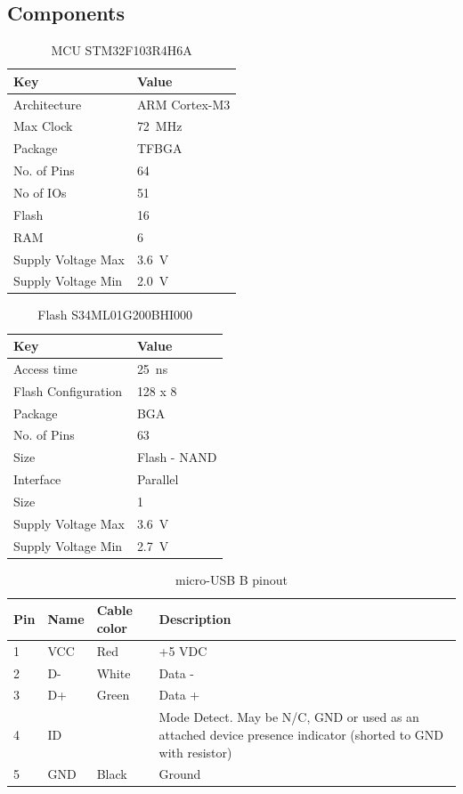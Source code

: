 \documentclass[final,a4paper]{report} %
\begin{document}
\subsection{Components}
\begin{table}[h]
	\centering
	\caption{MCU STM32F103R4H6A}
	\label{tab:mcu-specs}		
	\begin{tabular}{ll}
		\toprule		
		Key & Value \\
		\hline
		Architecture & ARM Cortex-M3 \\
		Max Clock & \SI{72}{\mega\hertz} \\
		Package & TFBGA \\
		No. of Pins & 64 \\
		No of IOs & 51 \\
		Flash & \SI{16}{\kibi\byte} \\
		RAM & \SI{6}{\kibi\byte} \\
		Supply Voltage Max & \SI{3.6}{\volt} \\
		Supply Voltage Min & \SI{2.0}{\volt} \\
		\bottomrule
	\end{tabular}
\end{table}

\begin{table}[h]
	\centering
	\caption{Flash S34ML01G200BHI000}
	\label{tab:flash-specs}
	\begin{tabular}{ll}
		\toprule		
		Key & Value \\
		\hline
		Access time & \SI{25}{\nano\second} \\
		Flash Configuration & 128\si{\mebi} x \SI{8}{\bit} \\
		Package & BGA \\
		No. of Pins & 63 \\
		Size & Flash - NAND \\	
		Interface & Parallel \\
		Size & \SI{1}{\gibi\bit} \\		
		Supply Voltage Max & \SI{3.6}{\volt} \\
		Supply Voltage Min & \SI{2.7}{\volt} \\
		\bottomrule
	\end{tabular}
\end{table}

\begin{table}[h]
	\centering
	\caption{micro-USB B pinout}
	\label{tab:microusb-pinout}		
	\begin{tabular}{lllp{6cm}}
		\toprule		
		Pin & Name & Cable color & Description\\
		\hline
		1 & VCC & Red & +5 VDC\\
		2 & D- & White & Data -\\
		3 & D+ & Green & Data +\\
		4 & ID &  & Mode Detect. May be N/C, GND or used as an attached device presence indicator (shorted to GND with resistor)\\
		5 & GND & Black & Ground\\
		\bottomrule
	\end{tabular}
\end{table}
\end{document}

